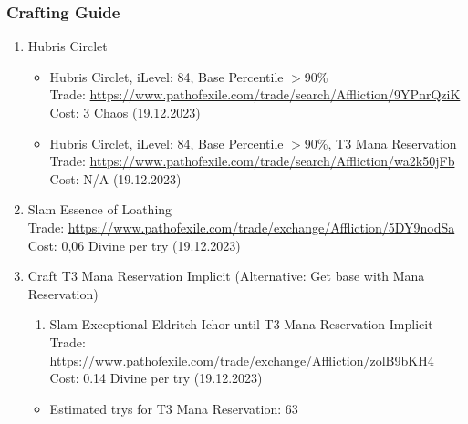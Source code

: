 \subsubsection{Crafting Guide}
\begin{enumerate}
	\item Hubris Circlet
	\begin{itemize}
		\item Hubris Circlet, iLevel: 84, Base Percentile $>$90\%\\
		Trade: \url{https://www.pathofexile.com/trade/search/Affliction/9YPnrQziK}\\
		Cost: 3 Chaos (19.12.2023)
		\item Hubris Circlet, iLevel: 84, Base Percentile $>$90\%, T3 Mana Reservation\\
		Trade: \url{https://www.pathofexile.com/trade/search/Affliction/wa2k50jFb}\\
		Cost: N/A (19.12.2023)
	\end{itemize}
	\item Slam Essence of Loathing\\
		Trade: \url{https://www.pathofexile.com/trade/exchange/Affliction/5DY9nodSa}\\
		Cost: 0,06 Divine per try (19.12.2023)
	\item Craft T3 Mana Reservation Implicit (Alternative: Get base with Mana Reservation)
		\begin{enumerate}
			\item Slam Exceptional Eldritch Ichor until T3 Mana Reservation Implicit\\
				Trade: \url{https://www.pathofexile.com/trade/exchange/Affliction/zolB9bKH4}\\
				Cost: 0.14 Divine per try (19.12.2023)
		\end{enumerate}
		\begin{itemize}
			\item Estimated trys for T3 Mana Reservation: 63
		\end{itemize}
\end{enumerate}